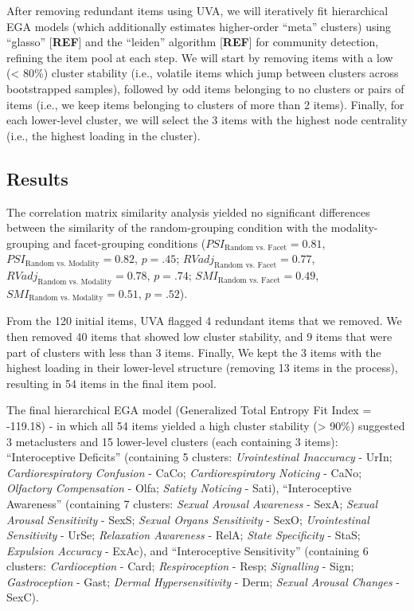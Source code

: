 \documentclass[
  jou,
  floatsintext,
  longtable,
  nolmodern,
  notxfonts,
  notimes,
  colorlinks=true,linkcolor=blue,citecolor=blue,urlcolor=blue]{apa7}
\begin{document}
After removing redundant items using UVA, we will iteratively fit
hierarchical EGA models (which additionally estimates higher-order
``meta'' clusters) using ``glasso'' {[}\textbf{REF}{]} and the
``leiden'' algorithm {[}\textbf{REF}{]} for community detection,
refining the item pool at each step. We will start by removing items
with a low (\textless{} 80\%) cluster stability (i.e., volatile items
which jump between clusters across bootstrapped samples), followed by
odd items belonging to no clusters or pairs of items (i.e., we keep
items belonging to clusters of more than 2 items). Finally, for each
lower-level cluster, we will select the 3 items with the highest node
centrality (i.e., the highest loading in the cluster).

\subsection{Results}\label{results}

The correlation matrix similarity analysis yielded no significant
differences between the similarity of the random-grouping condition with
the modality-grouping and facet-grouping conditions
(\(PSI_{\text{Random vs. Facet}} = 0.81\),
\(PSI_{\text{Random vs. Modality}} = 0.82\), \(p = .45\);
\(RVadj_{\text{Random vs. Facet}} = 0.77\),
\(RVadj_{\text{Random vs. Modality}} = 0.78\), \(p = .74\);
\(SMI_{\text{Random vs. Facet}} = 0.49\),
\(SMI_{\text{Random vs. Modality}} = 0.51\), \(p = .52\)).

From the 120 initial items, UVA flagged 4 redundant items that we
removed. We then removed 40 items that showed low cluster stability, and
9 items that were part of clusters with less than 3 items. Finally, We
kept the 3 items with the highest loading in their lower-level structure
(removing 13 items in the process), resulting in 54 items in the final
item pool.

The final hierarchical EGA model (Generalized Total Entropy Fit Index =
-119.18) - in which all 54 items yielded a high cluster stability
(\textgreater{} 90\%) suggested 3 metaclusters and 15 lower-level
clusters (each containing 3 items): ``Interoceptive Deficits''
(containing 5 clusters: \emph{Urointestinal Inaccuracy} - UrIn;
\emph{Cardiorespiratory Confusion} - CaCo; \emph{Cardiorespiratory
Noticing} - CaNo; \emph{Olfactory Compensation} - Olfa; \emph{Satiety
Noticing} - Sati), ``Interoceptive Awareness'' (containing 7 clusters:
\emph{Sexual Arousal Awareness} - SexA; \emph{Sexual Arousal
Sensitivity} - SexS; \emph{Sexual Organs Sensitivity} - SexO;
\emph{Urointestinal Sensitivity} - UrSe; \emph{Relaxation Awareness} -
RelA; \emph{State Specificity} - StaS; \emph{Expulsion Accuracy} -
ExAc), and ``Interoceptive Sensitivity'' (containing 6 clusters:
\emph{Cardioception} - Card; \emph{Respiroception} - Resp;
\emph{Signalling} - Sign; \emph{Gastroception} - Gast; \emph{Dermal
Hypersensitivity} - Derm; \emph{Sexual Arousal Changes} - SexC).
\end{document}

